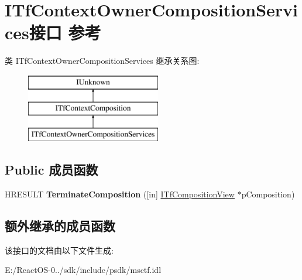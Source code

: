 \hypertarget{interface_i_tf_context_owner_composition_services}{}\section{I\+Tf\+Context\+Owner\+Composition\+Services接口 参考}
\label{interface_i_tf_context_owner_composition_services}
类 I\+Tf\+Context\+Owner\+Composition\+Services 继承关系图\+:\begin{figure}[H]
\begin{center}
\leavevmode
\includegraphics[height=3.000000cm]{interface_i_tf_context_owner_composition_services}
\end{center}
\end{figure}
\subsection*{Public 成员函数}
\begin{DoxyCompactItemize}
\item 
\mbox{\label{interface_i_tf_context_owner_composition_services_abf836eae360ce7cb93137a6d4a994eef}} 
H\+R\+E\+S\+U\+LT {\bfseries Terminate\+Composition} (\mbox{[}in\mbox{]} \hyperlink{interface_i_tf_composition_view}{I\+Tf\+Composition\+View} $\ast$p\+Composition)
\end{DoxyCompactItemize}
\subsection*{额外继承的成员函数}


该接口的文档由以下文件生成\+:\begin{DoxyCompactItemize}
\item 
E\+:/\+React\+O\+S-\/0../sdk/include/psdk/msctf.\+idl\end{DoxyCompactItemize}
